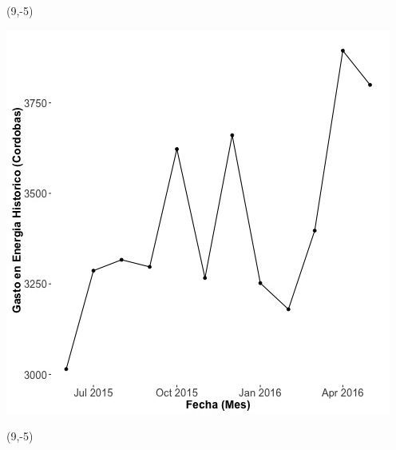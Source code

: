 \documentclass{article}\usepackage[]{graphicx}\usepackage[]{color}
\newenvironment{knitrout}{}{} %
\begin{document}
 \begin{textblock}{1}(9,-5)
\begin{minipage}{20em}
\begingroup

\endgroup
\end{minipage}
\end{textblock}

\begin{knitrout}
\color{fgcolor}
\includegraphics[scale=0.65]{figure/A21_historico_cordobas} 
\end{knitrout}

 \begin{textblock}{1}(9,-5)
\begin{minipage}{20em}
\begingroup

\endgroup
\end{minipage}
\end{textblock}
\end{document}
